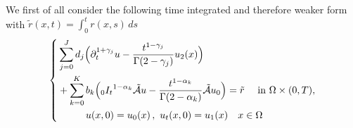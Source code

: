 We first of all consider the following time integrated and therefore weaker form with $\tilde{r}(x,t)=\int_0^t r(x,s)\, ds$
\begin{equation}\label{eqn:sumfrac_wave_acou_ibvp_timeint}
  \left\{\begin{aligned}
&\sum_{j=0}^J d_j
\Bigl(\partial_t^{1+\gamma_j} u-\frac{t^{1-\gamma_j}}{\Gamma(2-\gamma_j)}u_2(x)\Bigr)\\
&+ \sum_{k=0}^K b_k \Bigl({_0I_t}^{1-\alpha_k} \tilde{\mathcal{A}} u - \frac{t^{1-\alpha_k}}{\Gamma(2-\alpha_k)}\tilde{\mathcal{A}} u_0\Bigr)
= \tilde{r} \quad \mbox{ in }\Omega\times(0,T),\\
    &\hspace*{1cm}u(x,0)  = u_0(x)\,, \ u_t(x,0) = u_1(x) \quad x\in\Omega
  \end{aligned}\right.
\end{equation}

